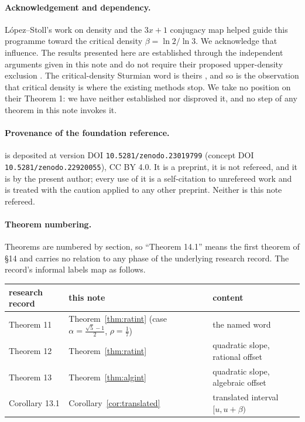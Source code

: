 \documentclass[11pt]{article}
\begin{document}
\paragraph{Acknowledgement and dependency.}
L\'opez--Stoll's work on density and the $3x+1$ conjugacy map helped guide this programme toward the
critical density $\beta=\ln2/\ln3$. We acknowledge that influence. The results presented here are
established through the independent arguments given in this note and do not require their proposed
upper-density exclusion \cite{LopezStoll2021}. The critical-density Sturmian word is theirs
\cite{LopezStoll2009}, and so is the observation that critical density is where the existing methods
stop. We take no position on their Theorem 1: we have neither established nor disproved it, and no
step of any theorem in this note invokes it.

\paragraph{Provenance of the foundation reference.}
\cite{DeJesus2026Sturmian} is deposited at version DOI \texttt{10.5281/zenodo.23019799} (concept DOI
\texttt{10.5281/zenodo.22920055}), CC BY 4.0. It is a preprint, it is not refereed, and it is by the
present author; every use of it is a self-citation to unrefereed work and is treated with the caution
applied to any other preprint. Neither is this note refereed.

\paragraph{Theorem numbering.}
Theorems are numbered by section, so ``Theorem 14.1'' means the first theorem of \S14 and carries no
relation to any phase of the underlying research record. The record's informal labels map as follows.
\begin{center}
\begin{tabular}{@{}lll@{}}
\toprule
research record & this note & content \\
\midrule
Theorem 11 & Theorem~\ref{thm:ratint} (case $\alpha=\tfrac{\sqrt5-1}2$, $\rho=\tfrac17$) & the named word \\
Theorem 12 & Theorem~\ref{thm:ratint} & quadratic slope, rational offset \\
Theorem 13 & Theorem~\ref{thm:algint} & quadratic slope, algebraic offset \\
Corollary 13.1 & Corollary~\ref{cor:translated} & translated interval $[u,u+\beta)$ \\
\bottomrule
\end{tabular}
\end{center}
\end{document}
